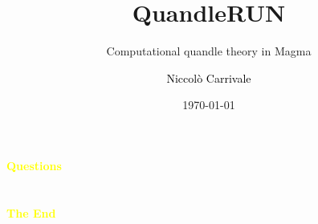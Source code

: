 \documentclass[aspectratio=43]{beamer}
\title{QuandleRUN} %
\subtitle{Computational quandle theory in Magma}
\author[N. Carrivale]{\textcolor{black}{Niccolò Carrivale}}
\institute[Radboud University]{
    \textcolor{black}{Faculty of Science}%
    \\%
    \textcolor{black}{Radboud University}%
    \\%
    \textcolor{black}{Nijmegen, The Netherlands}%
}
\date{\today}
\begin{document}
    
    \frame{\titlepage}
    


    


  \section{}
    \begin{frame}{}
        \centering
            \Huge\bfseries
        \textcolor{yellow}{Questions}
        
    \end{frame}



    \section{}
    \begin{frame}{}
        \centering
            \Huge\bfseries
        \textcolor{yellow}{The End}
        
    \end{frame}
\end{document}
